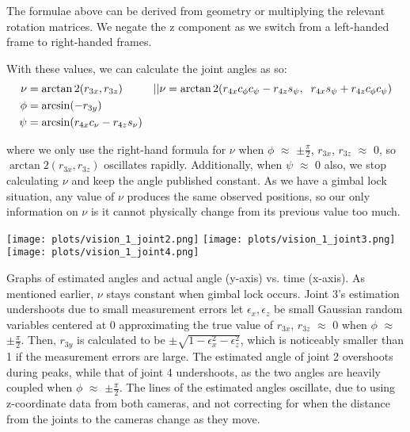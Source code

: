 \documentclass[11pt, a4paper]{article}
\begin{document}
    The formulae above can be derived from geometry or multiplying the relevant
    rotation matrices. We negate the z component
    as we switch from a left-handed frame to right-handed frames.

    With these values, we can calculate the joint angles as so:
    \begin{align*}
        \nu  &= \arctan2(r_{3x}, r_{3z}) &|| &\nu = \arctan2(r_{4x}c_{\phi}c_{\psi} - r_{4z}s_{\psi}, \hspace{0.2cm}
                    r_{4x}s_{\psi} + r_{4z}c_{\phi}c_{\psi}
    )\\
        \phi &= \arcsin(-r_{3y})\\
        \psi &= \arcsin(r_{4x}c_{\nu} - r_{4z}s_{\nu})
    \end{align*}

    where we only use the right-hand formula for $\nu$ when $\phi$ $\approx$ $\pm\frac{\pi}{2}$, 
    $r_{3x}$, $r_{3z}$ $\approx$ $0$, so $\arctan2(r_{3x}, r_{3z})$ oscillates rapidly.
    Additionally, when $\psi$ $\approx$ $0$ also, we stop calculating
    $\nu$ and keep the angle published constant. As we have
    a gimbal lock situation, any value of $\nu$ produces the same observed
    positions, so our only information on $\nu$ is
    it cannot physically change from its previous value too much.
    
    \begin{center}
        \texttt{[image: plots/vision\_1\_joint2.png]}
        \texttt{[image: plots/vision\_1\_joint3.png]}
        \texttt{[image: plots/vision\_1\_joint4.png]}
    \end{center}

    Graphs of estimated angles and actual angle (y-axis) vs. time (x-axis). As mentioned earlier, $\nu$ stays constant when gimbal lock occurs.
    Joint 3's estimation undershoots due to small measurement errors \textemdash 
    let $\epsilon_x, \epsilon_z$ be small Gaussian random variables centered at 0 approximating the
    true value of $r_{3x}$, $r_{3z}$ $\approx$ 0 when $\phi$ $\approx$ $\pm\frac{\pi}{2}$. 
    Then, $r_{3y}$ is calculated to be $\pm\sqrt{1 - \epsilon_x^2 - \epsilon_z^2}$, which is noticeably smaller than 1 if the measurement errors are large.
    The estimated angle of joint 2 overshoots during peaks, while that of joint 4 undershoots,
    as the two angles are heavily coupled when $\phi$ $\approx$ $\pm\frac{\pi}{2}$.
    The lines of the estimated angles oscillate, due to using z-coordinate data from both cameras, 
    and not correcting for when the distance from the joints to the cameras change as they move. 
    
\end{document}
